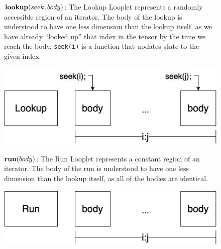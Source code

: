 \begin{figure}[ht]
    \footnotesize
    \begin{minipage}[c]{0.6\linewidth}
        $\text{\textbf{lookup}}(seek, body)$: The Lookup Looplet represents a
        randomly accessible region of an iterator. The body of the lookup is
        understood to have one less dimension than the lookup itself, as we have
        already ``looked up'' that index in the tensor by the time we reach the
        body. \texttt{seek(i)} is a function that updates state to the given
        index.
    \end{minipage}%
    \begin{minipage}[c]{0.4\linewidth}
        \centering
        \includegraphics[scale=0.25]{Looplets-lookup.png}
    \end{minipage}

    \begin{minipage}[c]{0.6\linewidth}
        $\text{\textbf{run}}(body)$: The Run Looplet represents a constant
        region of an iterator. The body of the run is understood to have one
        less dimension than the lookup itself, as all of the bodies are
        identical.
    \end{minipage}%
    \begin{minipage}[c]{0.4\linewidth}
        \centering
        \includegraphics[scale=0.25]{Looplets-run.png}
    \end{minipage}


\end{figure}
